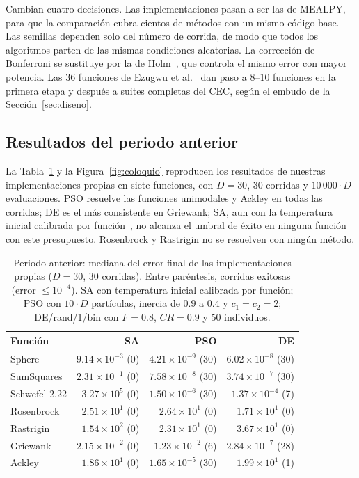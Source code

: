 \documentclass[11pt,letterpaper]{article}
\begin{document}
Cambian cuatro decisiones. Las implementaciones pasan a ser las de MEALPY, para que la comparación cubra cientos de métodos con un mismo código base. Las semillas dependen solo del número de corrida, de modo que todos los algoritmos parten de las mismas condiciones aleatorias. La corrección de Bonferroni se sustituye por la de Holm~\cite{holm1979}, que controla el mismo error con mayor potencia. Las 36 funciones de Ezugwu et al.~\cite{ezugwu2020} dan paso a 8--10 funciones en la primera etapa y después a suites completas del CEC, según el embudo de la Sección~\ref{sec:diseno}.

\subsection{Resultados del periodo anterior}

La Tabla~\ref{tab:coloquio} y la Figura~\ref{fig:coloquio} reproducen los resultados de nuestras implementaciones propias en siete funciones, con $D=30$, 30 corridas y $10\,000\cdot D$ evaluaciones. PSO resuelve las funciones unimodales y Ackley en todas las corridas; DE es el más consistente en Griewank; SA, aun con la temperatura inicial calibrada por función~\cite{benameur2004}, no alcanza el umbral de éxito en ninguna función con este presupuesto. Rosenbrock y Rastrigin no se resuelven con ningún método.

\begin{table}[H]
\centering
\caption{Periodo anterior: mediana del error final de las implementaciones propias ($D=30$, 30 corridas). Entre paréntesis, corridas exitosas (error $\le 10^{-4}$). SA con temperatura inicial calibrada por función; PSO con $10\cdot D$ partículas, inercia de 0.9 a 0.4 y $c_1=c_2=2$; DE/rand/1/bin con $F=0.8$, $CR=0.9$ y 50 individuos.}
\label{tab:coloquio}
\small
\begin{tabular}{@{}lrrr@{}}
\toprule
Función & SA & PSO & DE \\
\midrule
Sphere & $9.14\times10^{-3}$ (0) & $4.21\times10^{-9}$ (30) & $6.02\times10^{-8}$ (30) \\
SumSquares & $2.31\times10^{-1}$ (0) & $7.58\times10^{-8}$ (30) & $3.74\times10^{-7}$ (30) \\
Schwefel 2.22 & $3.27\times10^{5}$ (0) & $1.50\times10^{-6}$ (30) & $1.37\times10^{-4}$ (7) \\
Rosenbrock & $2.51\times10^{1}$ (0) & $2.64\times10^{1}$ (0) & $1.71\times10^{1}$ (0) \\
Rastrigin & $1.54\times10^{2}$ (0) & $2.31\times10^{1}$ (0) & $3.67\times10^{1}$ (0) \\
Griewank & $2.15\times10^{-2}$ (0) & $1.23\times10^{-2}$ (6) & $2.84\times10^{-7}$ (28) \\
Ackley & $1.86\times10^{1}$ (0) & $1.65\times10^{-5}$ (30) & $1.99\times10^{1}$ (1) \\
\bottomrule
\end{tabular}
\end{table}
\end{document}

